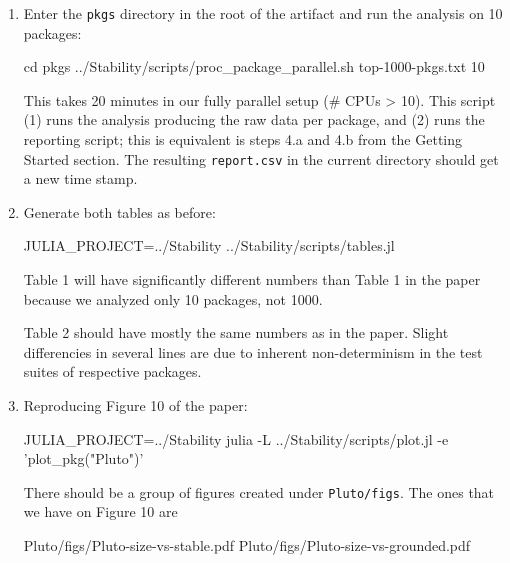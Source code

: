 \documentclass[
]{article}
\begin{document}
\begin{enumerate}
  \def\labelenumii{\alph{enumii}.}
  \item
    Enter the \texttt{pkgs} directory in the root of the artifact and run the analysis
    on 10 packages:

\begin{verbnobox}[\small]
cd pkgs
../Stability/scripts/proc_package_parallel.sh top-1000-pkgs.txt 10
\end{verbnobox}

    This takes 20 minutes in our fully parallel setup (\# CPUs \textgreater{}
    10). This script (1) runs the analysis producing the raw data per package, and
    (2) runs the reporting script; this is equivalent is steps 4.a and
    4.b from the Getting Started section. The resulting \texttt{report.csv}
    in the current directory should get a new time stamp.

  \item
    Generate both tables as before:

\begin{verbnobox}[\small]
JULIA_PROJECT=../Stability ../Stability/scripts/tables.jl
\end{verbnobox}

    Table 1 will have significantly different numbers than Table 1 in the paper
    because we analyzed only 10 packages, not 1000.

    Table 2 should have mostly the same numbers as in the paper. Slight
    differencies in several lines are due to inherent non-determinism in the
    test suites of respective packages.

  \item
    Reproducing Figure 10 of the paper:

\begin{verbnobox}[\small]
JULIA_PROJECT=../Stability julia -L ../Stability/scripts/plot.jl -e 'plot_pkg("Pluto")'
\end{verbnobox}

    There should be a group of figures created under
    \texttt{Pluto/figs}. The ones that we have on Figure 10 are

\begin{verbnobox}[\small]
Pluto/figs/Pluto-size-vs-stable.pdf
Pluto/figs/Pluto-size-vs-grounded.pdf
\end{verbnobox}

\end{enumerate}
\end{document}
